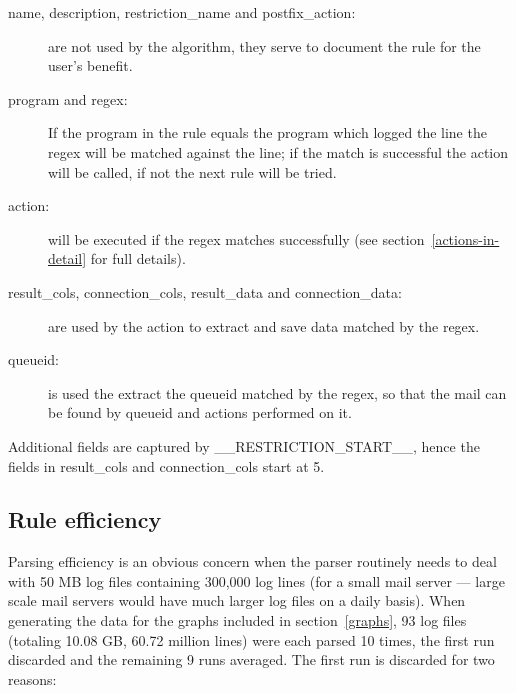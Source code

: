 \documentclass[a4paper,12pt,draft]{article}
\begin{document}
\begin{description}

    \item [name, description, restriction\_name and postfix\_action:] are
        not \newline used by the algorithm, they serve to document the rule
        for the user's benefit.

    \item [program and regex:] If the program in the rule equals the
        program which logged the line the regex will be matched against the
        line; if the match is successful the action will be called, if not
        the next rule will be tried.

    \item [action:] will be executed if the regex matches successfully (see
        section~\ref{actions-in-detail} for full details).

    \item [result\_cols, connection\_cols, result\_data and
        connection\_data:] are \newline used by the action to extract and
        save data matched by the regex.

    \item [queueid:] is used the extract the queueid matched by the regex,
        so that the mail can be found by queueid and actions performed on
        it.

\end{description}

Additional fields are captured by \_\_RESTRICTION\_START\_\_, hence the
fields in result\_cols and connection\_cols start at 5.

        
\subsection{Rule efficiency}

\label{rule efficiency}

Parsing efficiency is an obvious concern when the parser routinely needs to
deal with 50 MB log files containing 300,000 log lines (for a small mail
server --- large scale mail servers would have much larger log files on a
daily basis).  When generating the data for the graphs included in
section~\ref{graphs}, 93 log files (totaling 10.08 GB, 60.72 million lines)
were each parsed 10 times, the first run discarded and the remaining 9 runs
averaged.  The first run is discarded for two reasons:
\end{document}
